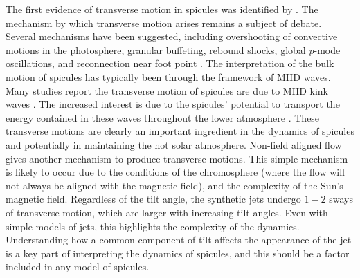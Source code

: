 %
The first evidence of transverse motion in spicules was identified by \cite{Pasachoff1968SoPh5131P}. The mechanism by which transverse motion arises remains a subject of debate. Several mechanisms have been suggested, including overshooting of convective motions in the photosphere, granular buffeting, rebound shocks, global $p$-mode oscillations, and reconnection near foot point \citep{Roberts1979SoPh6123R, Sterling1988ApJ327950S, Vranjes2008A_A478553V, Jess2012ApJ744L5J, Ebadi2014ApSS35331E}. The interpretation of the bulk motion of spicules has typically been through the framework of MHD waves. Many studies report the transverse motion of spicules are due to MHD kink waves \citep{Kukhianidze2006AA, De_Pontieu2007, Jess2012ApJ744L5J, Ebadi2014ApSS35331E, Tavabi2015AA573A4T, Jafarzadeh2017ApJS2299J}. The increased interest is due to the spicules' potential to transport the energy contained in these waves throughout the lower atmosphere \citep{De_Pontieu2007, He2009ApJ705L217H, Morton2012NatCo31315M, Jess2012ApJ744L5J}.  These transverse motions are clearly an important ingredient in the dynamics of spicules and potentially in maintaining the hot solar atmosphere. Non-field aligned flow gives another mechanism to produce transverse motions. This simple mechanism is likely to occur due to the conditions of the chromosphere (where the flow will not always be aligned with the magnetic field), and the complexity of the Sun’s magnetic field. Regardless of the tilt angle, the synthetic jets undergo $1-2$ sways of transverse motion, which are larger with increasing tilt angles. Even with simple models of jets, this highlights the complexity of the dynamics. Understanding how a common component of tilt affects the appearance of the jet is a key part of interpreting the dynamics of spicules, and this should be a factor included in any model of spicules.
